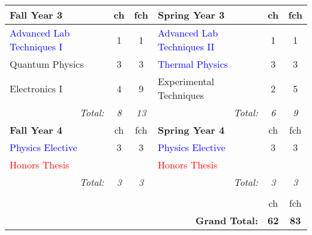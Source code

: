 \documentclass[12pt,preprint]{aastex}
\newcommand{\red}[1]{\textcolor{red}{#1}}
\newcommand{\blue}[1]{\textcolor{blue}{#1}}
\begin{document}
\begin{longtable}{lcclcc}
\hline
{\bf Fall Year 3} & {\sc ch} & {\sc fch} & {\bf Spring Year 3} & {\sc ch} & {\sc fch}  \\ 
\hline
\hline
\blue{Advanced Lab Techniques I} & 1 & 1 & \blue{Advanced Lab Techniques II} & 1 & 1 \\
Quantum Physics                  & 3 & 3 & \blue{Thermal Physics}            & 3 & 3 \\
Electronics I                    & 4 & 9 & Experimental Techniques           & 2 & 5 \\
\multicolumn{1}{r}{\emph{Total:}} & \emph{8} & \emph{13} &
\multicolumn{1}{r}{\emph{Total:}} & \emph{6}  & \emph{9} \\

\hline
{\bf Fall Year 4} & {\sc ch} & {\sc fch} & {\bf Spring Year 4} & {\sc ch} & {\sc fch} \\ 
\hline
\hline
\blue{Physics Elective} & 3 & 3 & \blue{Physics Elective}  & 3 & 3 \\
\red{Honors Thesis} &   &   & \red{Honors Thesis}  &  &  \\
\multicolumn{1}{r}{\emph{Total:}} & \emph{3} & \emph{3} &
\multicolumn{1}{r}{\emph{Total:}} & \emph{3}  & \emph{3} \\
\hline \\
 &   &   &  & {\sc ch} & {\sc fch} \\  
 &   &   & \multicolumn{1}{r}{{\bf Grand Total:}} & {\bf 62} & {\bf 83} \\  
\end{longtable}
\end{document}
